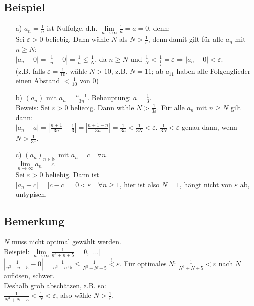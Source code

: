 \documentclass[12pt, titlepage]{article}
\newcommand{\N}{\mathds{N}}
\newcommand{\infn}{n\rightarrow\infty}
\renewcommand{\>}{\rightarrow}
\renewcommand{\*}{\cdot}
\renewcommand{\epsilon}{\varepsilon}
\begin{document}
	\subsection{Beispiel}
	\begin{itemize}
		\item[a)] $a_n=\frac{1}{n}$ ist Nulfolge, d.h. $\lim\limits_{\infn}\frac{1}{n}=a=0$, denn:\\
		Sei $\epsilon>0$ beliebig. Dann wähle $N$ als $N>\frac{1}{\epsilon}$, denn damit gilt für alle $a_n$ mit $n\geq N$:\\
		$|a_n-0|=|\frac{1}{n}-0|=\frac{1}{n}\leq\frac{1}{N}$, da $n\geq N$ und $\frac{1}{N}<\frac{1}{\frac{1}{\epsilon}}=\epsilon\Rightarrow|a_n-0|<\epsilon$.\\
		(z.B. falls $\epsilon=\frac{1}{10}$, wähle $N>10$, z.B. $N=11$; ab $a_{11}$ haben alle Folgenglieder einen Abstand $<\frac{1}{10}$ von 0)
		\item[b)] $(a_n)$ mit $a_n=\frac{n+1}{3n}$. Behauptung: $a=\frac{1}{3}$.\\
		Beweis: Sei $\epsilon>0$ beliebig. Dann wähle $N>\frac{1}{3\epsilon}$. Für alle $a_n$ mit $n\geq N$ gilt dann:\\
		$|a_n-a|=|\frac{n+1}{3n}-\frac{1}{3}|=|\frac{n+1-n}{3n}|=\frac{1}{3n}<\frac{1}{3N}<\epsilon$. $\frac{1}{3N}<\epsilon$ genau dann, wenn $N>\frac{1}{3\epsilon}$.
		\item[c)] $(a_n)_{n\in\N}$ mit $a_n=c\quad\forall n$.\\
		$\lim\limits_{\infn}a_n=c$\\
		Sei $\epsilon>0$ beliebig. Dann ist\\
		$|a_n-c|=|c-c|=0<\epsilon\quad\forall n\geq1$, hier ist also $N=1$, hängt nicht von $\epsilon$ ab, untypisch.
	\end{itemize}
	\subsection{Bemerkung}
	$N$ muss nicht optimal gewählt werden.\\
	Beispiel: $\lim\limits_{\infn}\frac{1}{n^3+n+5}=0$, [...]\\
	$|\frac{1}{n^3+n+5}-0|=\frac{1}{n^3+n^+5}\leq\frac{1}{N^3+N+5}\overset{!}{<}\epsilon$. Für optimales $N$: $\frac{1}{N^3+N+5}<\epsilon$ nach $N$ auflösen, schwer.\\
	Deshalb grob abschätzen, z.B. so:\\
	$\frac{1}{N^3+N+5}<\frac{1}{N}<\epsilon$, also wähle $N>\frac{1}{\epsilon}$.
\end{document}
